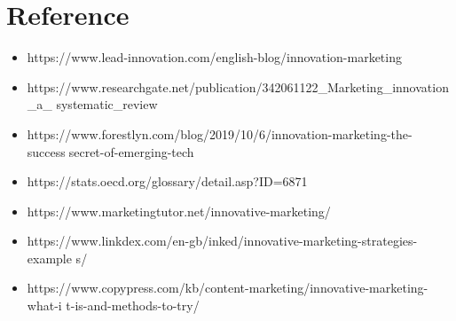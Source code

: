 \documentclass{article}
\begin{document}
\section{Reference}
\begin{itemize}
\item https://www.lead-innovation.com/english-blog/innovation-marketing
\item  https://www.researchgate.net/publication/342061122_Marketing_innovation_a_
systematic_review
\item https://www.forestlyn.com/blog/2019/10/6/innovation-marketing-the-successsecret-of-emerging-tech
\item  https://stats.oecd.org/glossary/detail.asp?ID=6871
\item  https://www.marketingtutor.net/innovative-marketing/
\item  https://www.linkdex.com/en-gb/inked/innovative-marketing-strategies-example
s/
\item  https://www.copypress.com/kb/content-marketing/innovative-marketing-what-i
t-is-and-methods-to-try/
\end{itemize}
\end{document}
